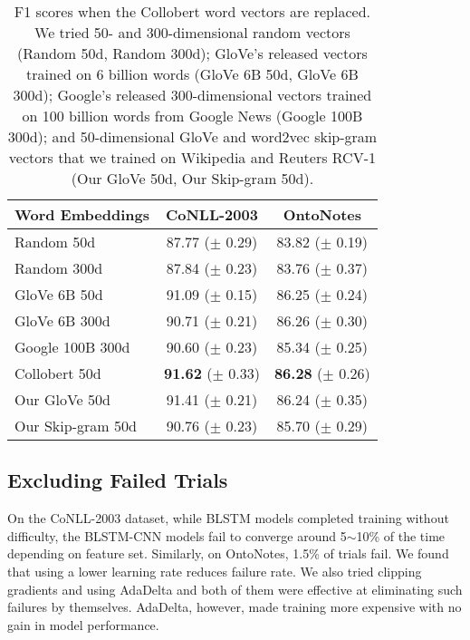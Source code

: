 \documentclass[11pt,letterpaper]{article}
\begin{document}
\begin{table}[t!]
\begin{center}
\small
\begin{tabular}{|l|c|c|}
\hline \bf Word Embeddings & \bf CoNLL-2003 & \bf OntoNotes \\ \hline
Random 50d       & 87.77 ($\pm$ 0.29) & 83.82 ($\pm$ 0.19) \\
Random 300d      & 87.84 ($\pm$ 0.23) & 83.76 ($\pm$ 0.37) \\
GloVe 6B 50d     & 91.09 ($\pm$ 0.15) & 86.25 ($\pm$ 0.24) \\
GloVe 6B 300d    & 90.71 ($\pm$ 0.21) & 86.26 ($\pm$ 0.30) \\
Google 100B 300d & 90.60 ($\pm$ 0.23) & 85.34 ($\pm$ 0.25) \\ \hline
Collobert 50d    & {\bf 91.62} ($\pm$ 0.33) & {\bf 86.28} ($\pm$ 0.26) \\
Our GloVe 50d    & 91.41 ($\pm$ 0.21) & 86.24 ($\pm$ 0.35) \\
Our Skip-gram 50d & 90.76 ($\pm$ 0.23) & 85.70 ($\pm$ 0.29) \\
\hline
\end{tabular}
\end{center}
\caption{
F1 scores when the Collobert word vectors are replaced. We tried 50- and 300-dimensional random vectors (Random 50d, Random 300d); GloVe's released vectors trained on 6 billion words (GloVe 6B 50d, GloVe 6B 300d); Google's released 300-dimensional vectors trained on 100 billion words from Google News (Google 100B 300d); and 50-dimensional GloVe and word2vec skip-gram vectors that we trained on Wikipedia and Reuters RCV-1 (Our GloVe 50d, Our Skip-gram 50d).
}
\label{tab:wordvec-res}
\end{table}

\subsection{Excluding Failed Trials}
\label{sec:failed-trials}
On the CoNLL-2003 dataset, while BLSTM models completed training without difficulty, the BLSTM-CNN models fail to converge around 5$\sim$10\% of the time depending on feature set. Similarly, on OntoNotes, 1.5\% of trials fail. We found that using a lower learning rate
reduces failure rate. We also tried clipping gradients and using AdaDelta and both of them were effective at eliminating such failures by themselves.
AdaDelta, however, made training more expensive with no gain in model performance.
\end{document}

